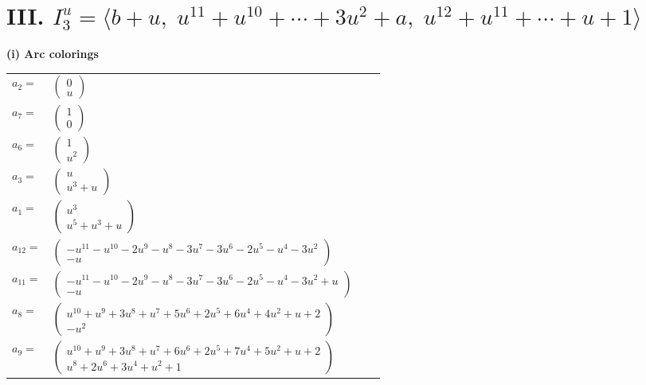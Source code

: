 \documentclass[1p]{elsarticle_modified}
\theoremstyle{definition}
\begin{document}
\centering \section*{III. $I^u_{3}= \langle b+u,\;u^{11}+u^{10}+\cdots+3 u^2+a,\;u^{12}+u^{11}+\cdots+u+1 \rangle$}
\flushleft \textbf{(i) Arc colorings}\\
\begin{tabular}{m{7pt} m{180pt} m{7pt} m{180pt} }
\flushright $a_{2}=$&$\begin{pmatrix}0\\u\end{pmatrix}$ \\
\flushright $a_{7}=$&$\begin{pmatrix}1\\0\end{pmatrix}$ \\
\flushright $a_{6}=$&$\begin{pmatrix}1\\u^2\end{pmatrix}$ \\
\flushright $a_{3}=$&$\begin{pmatrix}u\\u^3+u\end{pmatrix}$ \\
\flushright $a_{1}=$&$\begin{pmatrix}u^3\\u^5+u^3+u\end{pmatrix}$ \\
\flushright $a_{12}=$&$\begin{pmatrix}- u^{11}- u^{10}-2 u^9- u^8-3 u^7-3 u^6-2 u^5- u^4-3 u^2\\- u\end{pmatrix}$ \\
\flushright $a_{11}=$&$\begin{pmatrix}- u^{11}- u^{10}-2 u^9- u^8-3 u^7-3 u^6-2 u^5- u^4-3 u^2+u\\- u\end{pmatrix}$ \\
\flushright $a_{8}=$&$\begin{pmatrix}u^{10}+u^9+3 u^8+u^7+5 u^6+2 u^5+6 u^4+4 u^2+u+2\\- u^2\end{pmatrix}$ \\
\flushright $a_{9}=$&$\begin{pmatrix}u^{10}+u^9+3 u^8+u^7+6 u^6+2 u^5+7 u^4+5 u^2+u+2\\u^8+2 u^6+3 u^4+u^2+1\end{pmatrix}$ \\

\end{tabular}
\end{document}
